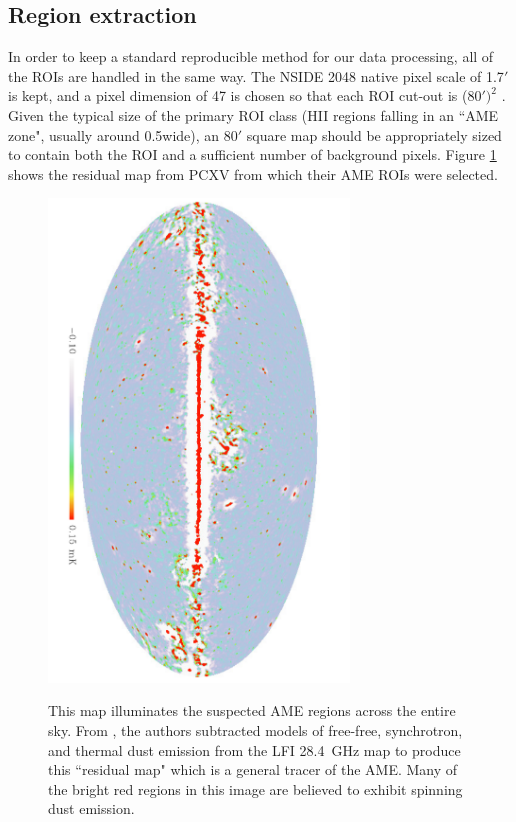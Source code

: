 \subsection{Region extraction}
     In order to keep a standard reproducible method for our data processing, all of the ROIs are handled in the same way. The NSIDE 2048 native pixel scale of 1.7$'$ is kept, and a pixel dimension of 47 is chosen so that each ROI cut-out is (80$')^2$ . Given the typical size of the primary ROI class (HII regions falling in an ``AME zone", usually around 0.5\degree wide), an 80$'$ square map should be appropriately sized to contain both the ROI and a sufficient number of background pixels. Figure \ref{fig:PCXVresmap} shows the residual map from PCXV from which their AME ROIs were selected.
\begin{figure}[htb!]
\begin{center}
\includegraphics[width=80mm, angle=90]{EPS/planckXV_fig1.pdf}
\label{PCXVmap}
\caption{This map illuminates the suspected AME regions across the entire sky. From \cite{planckXV}, the authors subtracted models of free-free, synchrotron, and thermal dust emission from the LFI 28.4~GHz map to produce this ``residual map" which is a general tracer of  the AME. Many of the bright red regions in this image are believed to exhibit spinning dust emission.}
\label{fig:PCXVresmap}
\end{center}
\end{figure}

